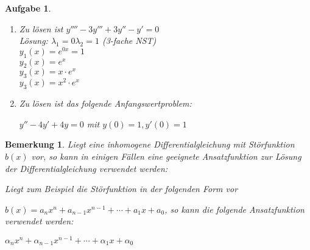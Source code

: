 \documentclass[fontset=ubuntu,12pt,a4paper]{scrreprt}
\newtheorem{bemerkung}[defi]{Bemerkung}
\newtheorem{aufg}[defi]{Aufgabe}
\begin{document}
    \begin{aufg}
        \begin{enumerate}
            \begin{enumerate}[label=\emph{(\roman*)}]
                \item Zu lösen ist \(y''''-3y'''+3y''-y'=0\)
                \\ Lösung:
                \(\lambda_1=0  \lambda_2=1 \) (3-fache NST)
                \\ \(y_1(x)=e^{0x}=1 \) \\
                \(y_2(x)=e^{x} \) \\
                \(y_3(x)=x\cdot e^{x} \) \\
                 \(y_3(x)=x^2\cdot e^{x} \) \\
                \item Zu lösen ist das folgende Anfangswertproblem:
                
                \(y''-4y'+4y=0\) mit \(y(0)=1,y'(0)=1\)
            \end{enumerate}
        \end{enumerate}
    \end{aufg}

     \begin{bemerkung}
         Liegt eine inhomogene Differentialgleichung mit Störfunktion \(b(x)\) vor, so kann in einigen Fällen eine geeignete Ansatzfunktion zur Lösung der Differentialgleichung verwendet werden:

         Liegt zum Beispiel die Störfunktion in der folgenden Form vor

         \(b(x)=a_n x^n + a_{n-1} x^{n-1} + \cdots + a_1 x + a_0\), so kann die folgende Ansatzfunktion verwendet werden:

         \(\alpha_n x^n + \alpha_{n-1} x^{n-1} + \cdots + \alpha_1 x + \alpha_0\)
     \end{bemerkung}
\end{document}
